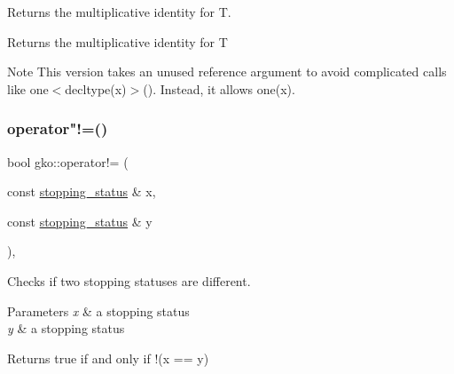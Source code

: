 Returns the multiplicative identity for T. 

\begin{DoxyReturn}{Returns}
the multiplicative identity for T
\end{DoxyReturn}
\begin{DoxyNote}{Note}
This version takes an unused reference argument to avoid complicated calls like {\ttfamily one$<$decltype(x)$>$()}. Instead, it allows {\ttfamily one(x)}. 
\end{DoxyNote}
\mbox{\label{namespacegko_accf1dbf5054c76e154490d825b0f44ee}} 
\subsubsection{\texorpdfstring{operator"!=()}{operator!=()}\hspace{0.1cm}{\footnotesize\ttfamily [1/3]}}
{\footnotesize\ttfamily bool gko\+::operator!= (\begin{DoxyParamCaption}\item[{const \hyperlink{classgko_1_1stopping__status}{stopping\+\_\+status} \&}]{x,  }\item[{const \hyperlink{classgko_1_1stopping__status}{stopping\+\_\+status} \&}]{y }\end{DoxyParamCaption})\hspace{0.3cm}{\ttfamily [inline]}, {\ttfamily [noexcept]}}



Checks if two stopping statuses are different. 


\begin{DoxyParams}{Parameters}
{\em x} & a stopping status \\
\hline
{\em y} & a stopping status\\
\hline
\end{DoxyParams}
\begin{DoxyReturn}{Returns}
true if and only if {\ttfamily !(x == y)} 
\end{DoxyReturn}
\mbox{\label{namespacegko_a74c3716da36cbedc000aa24006b0bd46}} 
